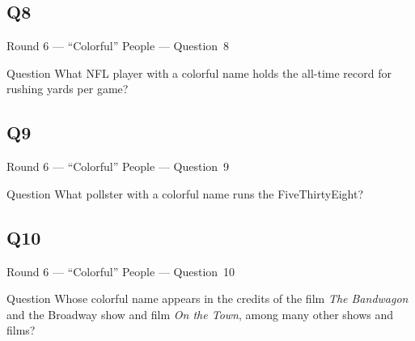 \documentclass[11pt]{beamer}
\begin{document}
\subsection*{Q8}
\begin{frame}[t]{Round 6 --- ``Colorful'' People --- \mbox{Question 8}}
\vspace{-0.5em}
\begin{block}{Question}
What NFL player with a colorful name holds the all-time record for rushing yards per game? 
\end{block}
\end{frame}
\subsection*{Q9}
\begin{frame}[t]{Round 6 --- ``Colorful'' People --- \mbox{Question 9}}
\vspace{-0.5em}
\begin{block}{Question}
What pollster with a colorful name runs the FiveThirtyEight?
\end{block}
\end{frame}
\subsection*{Q10}
\begin{frame}[t]{Round 6 --- ``Colorful'' People --- \mbox{Question 10}}
\vspace{-0.5em}
\begin{block}{Question}
Whose colorful name appears in the credits of the film \emph{The Bandwagon} and the Broadway show and film \emph{On the Town}, among many other shows and films?
\end{block}
\end{frame}
\end{document}
